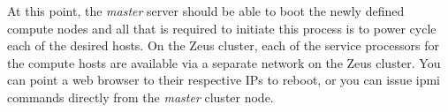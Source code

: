 At this point, the {\em master} server should be able to boot the newly defined
compute nodes and all that is required to initiate this process is to power
cycle each of the desired hosts.  On the Zeus cluster, each of the service
processors for the compute hosts are available via a separate network on the
Zeus cluster. You can point a web browser to their respective IPs to reboot, or
you can issue ipmi commands directly from the {\em master} cluster node.  
